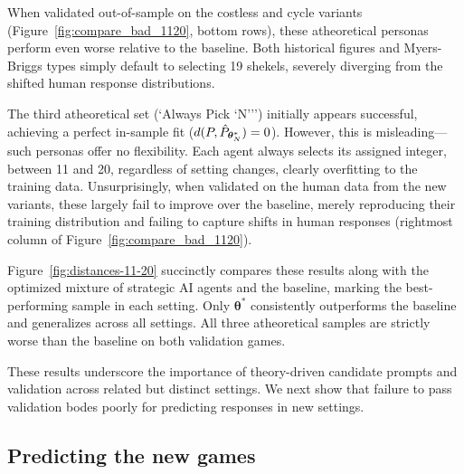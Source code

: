 \documentclass[11pt]{article}
\theoremstyle{definition}
\newcommand{\aisub}{AI agent}
\newcommand{\persona}{prompt}
\begin{document}
When validated out-of-sample on the costless and cycle variants (Figure~\ref{fig:compare_bad_1120}, bottom rows), these atheoretical personas perform even worse relative to the baseline. 
Both historical figures and Myers-Briggs types simply default to selecting 19 shekels, severely diverging from the shifted human response distributions.

The third atheoretical set (`Always Pick `N''') initially appears successful, achieving a perfect in-sample fit ($d(P, \hat P_{\bm\theta^*_{N}}) = 0$).
However, this is misleading---such personas offer no flexibility. 
Each agent always selects its assigned integer, between 11 and 20, regardless of setting changes, clearly overfitting to the training data.
Unsurprisingly, when validated on the human data from the new variants, these largely fail to improve over the baseline, merely reproducing their training distribution and failing to capture shifts in human responses (rightmost column of Figure~\ref{fig:compare_bad_1120}). 

Figure~\ref{fig:distances-11-20} succinctly compares these results along with the optimized mixture of strategic \aisub{s} and the baseline, marking the best-performing sample in each setting. 
Only $\bm{\theta}^*$ consistently outperforms the baseline and generalizes across all settings.
All three atheoretical samples are strictly worse than the baseline on both validation games.

These results underscore the importance of theory-driven candidate \persona{s} and validation across related but distinct settings.
We next show that failure to pass validation bodes poorly for predicting responses in new settings.

\subsection{Predicting the new games}
\label{sec:predict_new_games}
\end{document}
